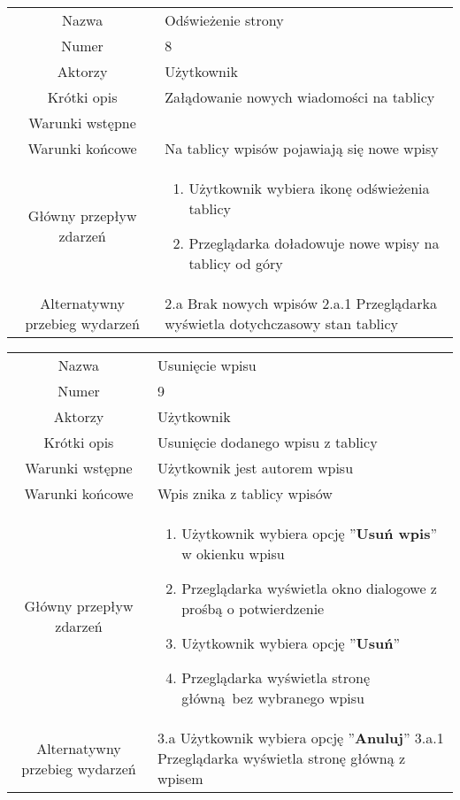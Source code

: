 \documentclass[a4paper]{article}
\begin{document}
\newline
\newline
\begin{tabular}{c p{10cm}}
Nazwa& Odświeżenie strony\\
Numer	& 8\\
Aktorzy &	Użytkownik\\
Krótki opis & Załądowanie nowych wiadomości na tablicy\\
Warunki wstępne& \\
Warunki końcowe& Na tablicy wpisów pojawiają się nowe wpisy\\
Główny przepływ zdarzeń&
\begin{enumerate}
\item Użytkownik wybiera ikonę odświeżenia tablicy
\item Przeglądarka doładowuje nowe wpisy na tablicy od góry
\end{enumerate} \\

Alternatywny przebieg wydarzeń & 
2.a Brak nowych wpisów \newline 
2.a.1 Przeglądarka wyświetla dotychczasowy stan tablicy
\\
\hline
\end{tabular}
\newline
\newline
\begin{tabular}{c p{10cm}}
Nazwa& Usunięcie wpisu\\
Numer	& 9\\
Aktorzy &	Użytkownik\\
Krótki opis & Usunięcie dodanego wpisu z tablicy\\
Warunki wstępne& Użytkownik jest autorem wpisu\\
Warunki końcowe& Wpis znika z tablicy wpisów\\
Główny przepływ zdarzeń&
\begin{enumerate}
\item Użytkownik wybiera opcję ''\textbf{Usuń wpis}'' w okienku wpisu
\item Przeglądarka wyświetla okno dialogowe z prośbą o potwierdzenie
\item Użytkownik wybiera opcję ''\textbf{Usuń}''
\item Przeglądarka wyświetla stronę główną bez wybranego wpisu
\end{enumerate} \\

Alternatywny przebieg wydarzeń & 
3.a Użytkownik wybiera opcję ''\textbf{Anuluj}'' \newline 
3.a.1 Przeglądarka wyświetla stronę główną z wpisem
\\
\hline
\end{tabular}
\end{document}
